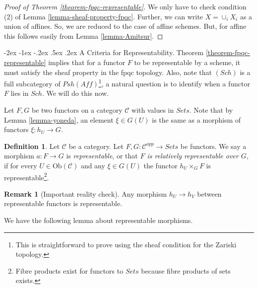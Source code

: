 \documentclass[11pt]{amsart}
\makeatletter
\renewcommand\subsection{\@startsection {subsection}{1}{\z@}%
	{-2ex \@plus -1ex \@minus -.2ex}%
	{.5ex \@plus.2ex}%
	{\normalfont\bfseries}}
\newcommand{\Ob}{\text{Ob}}
\theoremstyle{definition}
\newtheorem{definition}[theorem]{Definition}
\newtheorem{remark}[theorem]{Remark}
\makeatother
\begin{document}
\begin{proof}[Proof of Theorem \ref{theorem-fpqc-representable}]
We only have to check condition (2) of Lemma \ref{lemma-sheaf-property-fpqc}. Further, we can write $X=\cup_i X_i$ as a union of affines. So, we are reduced to the case of affine schemes. But, for affine this follows easily from Lemma \ref{lemma-Amitsur}.
\end{proof}

\subsection{A Criteria for Representability.} Theorem \ref{theorem-fpqc-representable} implies that for a functor $F$ to be representable by a scheme, it must satisfy the sheaf property in the fpqc topology. Also, note that $(\mathit{Sch})$ is a full subcategory of $\mathit{Psh}(\mathit{Aff})$\footnote{This is straightforward to prove using the sheaf condition for the Zariski topology.}, a natural question is to identify when a functor $F$ lies in $\mathit{Sch}$. We will do this now.

Let $F,G$ be two functors on a category $\mathcal{C}$ with values in $\mathit{Sets}$. Note that by Lemma \ref{lemma-yoneda}, an element $\xi\in G(U)$ is the same as a morphism of functors $\xi: h_U\rightarrow G$.


\begin{definition}
	\label{definition-representable-map-presheaves}
	Let $\mathcal{C}$ be a category.
	Let $F, G : \mathcal{C}^{opp} \to \textit{Sets}$
	be functors. We say a morphism $a : F \to G$ is
	{\it representable}, or that {\it $F$ is relatively representable
		over $G$}, if for every $U \in \Ob(\mathcal{C})$
	and any $\xi \in G(U)$ the functor
	$h_U \times_G F$ is representable\footnote{Fibre products exist for functors to $\mathit{Sets}$ because fibre products of sets exists.}.
\end{definition}

\begin{remark}[Important reality check]
	Any morphism $h_U\rightarrow h_V$ between representable functors is representable.
\end{remark}
We have the following lemma about representable morphisms.
\end{document}
